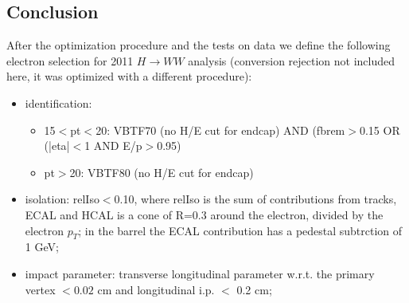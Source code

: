 \subsection{Conclusion}
After the optimization procedure and the tests on data we define the following electron selection for 2011 $H\rightarrow WW$ analysis (conversion rejection not included here, it was optimized with a different procedure):
\begin{itemize}
\item identification: 
  \begin{itemize}
  \item 15$<$pt$<$20: VBTF70 (no H/E cut for endcap) AND (fbrem$>$0.15 OR (|eta|$<$1 AND E/p$>$0.95)
  \item pt$>$20: VBTF80 (no H/E cut for endcap)
  \end{itemize}
\item isolation: relIso$<$0.10, where relIso is the sum of contributions from tracks, ECAL and HCAL is a cone of R=0.3 around the electron, 
  divided by the electron $p_T$; in the barrel the ECAL contribution has a pedestal subtrction of 1 GeV;
\item impact parameter: transverse longitudinal parameter w.r.t. the primary vertex $<0.02$ cm and longitudinal i.p. $<$ 0.2 cm;
\end{itemize}

